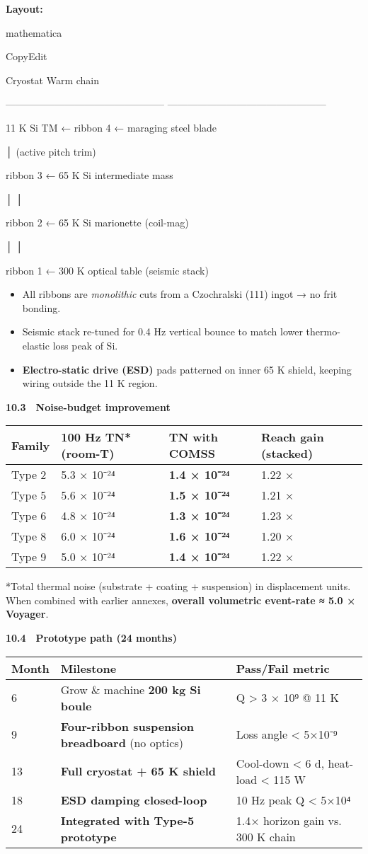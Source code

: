 \documentclass[]{article}
\begin{document}
\textbf{Layout:}

mathematica

CopyEdit

Cryostat Warm chain

------------------------------------------------
------------------------------------------------

11 K Si TM ← ribbon 4 ← maraging steel blade

│ (active pitch trim)

ribbon 3 ← 65 K Si intermediate mass

│ │

ribbon 2 ← 65 K Si marionette (coil-mag)

│ │

ribbon 1 ← 300 K optical table (seismic stack)

\begin{itemize}
\item
  All ribbons are \emph{monolithic} cuts from a Czochralski (111) ingot
  → no frit bonding.
\item
  Seismic stack re-tuned for 0.4 Hz vertical bounce to match lower
  thermo-elastic loss peak of Si.
\item
  \textbf{Electro-static drive (ESD)} pads patterned on inner 65 K
  shield, keeping wiring outside the 11 K region.
\end{itemize}

\textbf{10.3 Noise-budget improvement}

\begin{longtable}[]{@{}llll@{}}
\toprule
\textbf{Family} & \textbf{100 Hz TN* (room-T)} & \textbf{TN with COMSS}
& \textbf{Reach gain (stacked)}\tabularnewline
\midrule
\endhead
Type 2 & 5.3 × 10⁻²⁴ & \textbf{1.4 × 10⁻²⁴} & 1.22 ×\tabularnewline
Type 5 & 5.6 × 10⁻²⁴ & \textbf{1.5 × 10⁻²⁴} & 1.21 ×\tabularnewline
Type 6 & 4.8 × 10⁻²⁴ & \textbf{1.3 × 10⁻²⁴} & 1.23 ×\tabularnewline
Type 8 & 6.0 × 10⁻²⁴ & \textbf{1.6 × 10⁻²⁴} & 1.20 ×\tabularnewline
Type 9 & 5.0 × 10⁻²⁴ & \textbf{1.4 × 10⁻²⁴} & 1.22 ×\tabularnewline
\bottomrule
\end{longtable}

*Total thermal noise (substrate + coating + suspension) in displacement
units.\\
When combined with earlier annexes, \textbf{overall volumetric
event-rate ≈ 5.0 × Voyager}.

\textbf{10.4 Prototype path (24 months)}

\begin{longtable}[]{@{}lll@{}}
\toprule
\textbf{Month} & \textbf{Milestone} & \textbf{Pass/Fail
metric}\tabularnewline
\midrule
\endhead
6 & Grow \& machine \textbf{200 kg Si boule} & Q \textgreater{} 3 × 10⁹
@ 11 K\tabularnewline
9 & \textbf{Four-ribbon suspension breadboard} (no optics) & Loss angle
\textless{} 5×10⁻⁹\tabularnewline
13 & \textbf{Full cryostat + 65 K shield} & Cool-down \textless{} 6 d,
heat-load \textless{} 115 W\tabularnewline
18 & \textbf{ESD damping closed-loop} & 10 Hz peak Q \textless{}
5×10⁴\tabularnewline
24 & \textbf{Integrated with Type-5 prototype} & 1.4× horizon gain vs.
300 K chain\tabularnewline
\bottomrule
\end{longtable}
\end{document}
